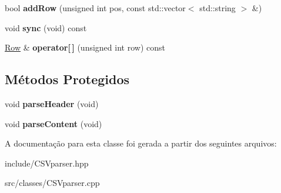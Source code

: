 \begin{DoxyCompactItemize}
\mbox{\label{classcsv_1_1Parser_ae7a0f306922cc4b2b0821051c964fb58}} 
bool {\bfseries add\+Row} (unsigned int pos, const std\+::vector$<$ std\+::string $>$ \&)
\item 
\mbox{\label{classcsv_1_1Parser_aae4f2ef5f35a4e24e017e4c89cfd924b}} 
void {\bfseries sync} (void) const
\item 
\mbox{\label{classcsv_1_1Parser_a64d7144f88ba0d2dad602ef836aa3338}} 
\hyperlink{classcsv_1_1Row}{Row} \& {\bfseries operator\mbox{[}$\,$\mbox{]}} (unsigned int row) const
\end{DoxyCompactItemize}
\subsection*{Métodos Protegidos}
\begin{DoxyCompactItemize}
\item 
\mbox{\label{classcsv_1_1Parser_a886ff444126f46270a6d5cf7a8d582ca}} 
void {\bfseries parse\+Header} (void)
\item 
\mbox{\label{classcsv_1_1Parser_ae384e4f89bfbd12871da9f4ddc3e6e0c}} 
void {\bfseries parse\+Content} (void)
\end{DoxyCompactItemize}


A documentação para esta classe foi gerada a partir dos seguintes arquivos\+:\begin{DoxyCompactItemize}
\item 
include/C\+S\+Vparser.\+hpp\item 
src/classes/C\+S\+Vparser.\+cpp\end{DoxyCompactItemize}
